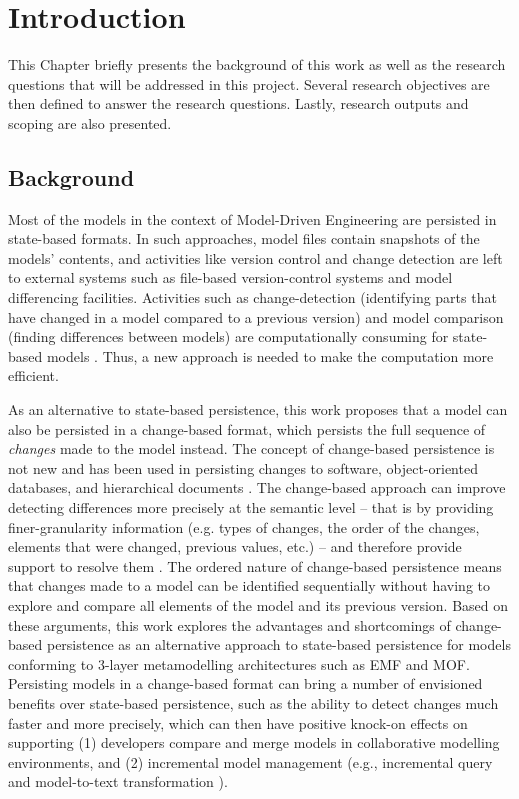 \chapter{Introduction}
\label{ch:introduction}
This Chapter briefly presents the background of this work as well as the research questions that will be 
addressed in this project. Several research objectives are then defined to answer the research questions. 
Lastly, research outputs and scoping are also presented. 

\section{Background}
\label{sec:background}
Most of the models in the context of Model-Driven Engineering are persisted in state-based formats. 
In such approaches, model files contain snapshots of the models' contents, and activities like version control 
and change detection are left to external systems such as file-based version-control systems and model differencing 
facilities. Activities such as change-detection (identifying parts that have changed in a model compared 
to a previous version) and model comparison (finding differences between models) are computationally consuming
for state-based models \cite{Kolovos:2009:DMM:1564596.1564641}. Thus, a new approach is needed to make the 
computation more efficient.

As an alternative to state-based persistence, this work proposes that a model can also be persisted in a change-based format, 
which persists the full sequence of \emph{changes} made to the model instead. 
The concept of change-based persistence is not new and has been used in persisting changes to software, 
object-oriented databases, and hierarchical documents 
\cite{DBLP:journals/entcs/RobbesL07,DBLP:conf/sde/LippeO92,DBLP:conf/caise/IgnatN05}. 
The change-based approach can improve detecting differences more precisely at the semantic 
level -- that is by providing finer-granularity information (e.g. types of changes, the order of the changes, 
elements that were changed, previous values, etc.) -- and therefore provide support to resolve them \cite{mens2002state}. 
The ordered nature of change-based persistence means that changes made to a model can be identified sequentially without 
having to explore and compare all elements of the model and its previous version. Based on these arguments, 
this work explores the advantages and shortcomings of change-based persistence as an alternative approach to 
state-based persistence for models conforming to 3-layer metamodelling architectures such as EMF and MOF. 
Persisting models in a change-based format can bring a number of envisioned benefits over state-based persistence, 
such as the ability to detect changes much faster and more precisely, which can then have positive 
knock-on effects on supporting (1) developers compare and merge models in collaborative modelling environments, 
and (2) incremental model management (e.g., incremental query \cite{DBLP:conf/ecmdafa/RathHV12} and 
model-to-text transformation \cite{DBLP:conf/ecmdafa/OgunyomiRK15}). 

